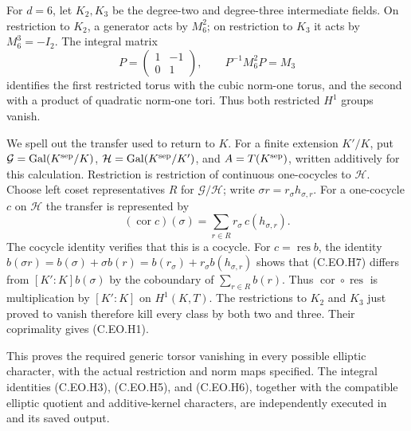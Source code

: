 For $d=6$, let $K_2,K_3$ be the degree-two and
degree-three intermediate fields. On restriction
to $K_2$, a generator acts by $M_6^2$; on restriction
to $K_3$ it acts by $M_6^3=-I_2$. The integral matrix
\[
 P=\begin{pmatrix}1&-1\\0&1\end{pmatrix},\qquad
                  P^{-1}M_6^2P=M_3                  \tag{C.EO.H6}
\]
identifies the first restricted torus with the
cubic norm-one torus, and the second with a product
of quadratic norm-one tori. Thus both restricted
$H^1$ groups vanish.

We spell out the transfer used to return to $K$.
For a finite extension $K'/K$, put
$\mathcal G=\operatorname{Gal}(K^{\rm sep}/K)$,
$\mathcal H=\operatorname{Gal}(K^{\rm sep}/K')$,
and $A=T(K^{\rm sep})$, written additively for this
calculation. Restriction is restriction of continuous
one-cocycles to $\mathcal H$. Choose left coset
representatives $R$ for $\mathcal G/\mathcal H$;
write $\sigma r=r_\sigma h_{\sigma,r}$.
For a one-cocycle $c$ on $\mathcal H$ the transfer
is represented by
\[
       (\operatorname{cor}c)(\sigma)
            =\sum_{r\in R}r_\sigma\,
                         c(h_{\sigma,r}).             \tag{C.EO.H7}
\]
The cocycle identity verifies that this is a cocycle.
For $c=\operatorname{res}b$, the identity
$b(\sigma r)=b(\sigma)+\sigma b(r)
=b(r_\sigma)+r_\sigma b(h_{\sigma,r})$
shows that (C.EO.H7) differs from
$[K':K]b(\sigma)$ by the coboundary of
$\sum_{r\in R}b(r)$. Thus
$\operatorname{cor}\circ\operatorname{res}$ is
multiplication by $[K':K]$ on $H^1(K,T)$.
The restrictions to $K_2$ and $K_3$ just proved
to vanish therefore kill every class by both
two and three. Their coprimality gives (C.EO.H1).

This proves the required generic torsor vanishing
in every possible elliptic character, with the
actual restriction and norm maps specified.
The integral identities (C.EO.H3), (C.EO.H5),
and (C.EO.H6), together with the compatible
elliptic quotient and additive-kernel characters,
are independently executed in
 and its saved output.
